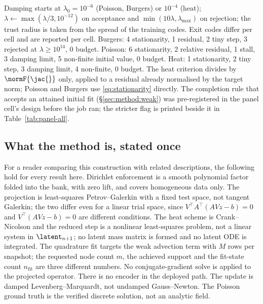 Damping starts at $\lambda_0=10^{-6}$ (Poisson, Burgers) or $10^{-4}$ (heat);
$\lambda\leftarrow\max(\lambda/3,10^{-12})$ on acceptance and
$\min(10\lambda,\lambda_{\max})$ on rejection; the trust radius is taken from the
spread of the training codes. Exit codes differ per cell and are reported per
cell. Burgers: 4 stationarity, 1 residual, 2 tiny step, 3 rejected at
$\lambda\ge10^{14}$, 0 budget. Poisson: 6 stationarity, 2 relative residual, 1
stall, 3 damping limit, 5 non-finite initial value, 0 budget. Heat: 1
stationarity, 2 tiny step, 3 damping limit, 4 non-finite, 0 budget. The heat
criterion divides by $\normF{\jac{}}$ only, applied to a residual already
normalised by the target norm; Poisson and Burgers use \eqref{eq:stationarity}
directly. The completion rule that accepts an attained initial fit
(\S\ref{sec:method:weak}) was pre-registered in the panel cell's design before
the job ran; the stricter flag is printed beside it in Table~\ref{tab:panel-all}.

\subsection{What the method is, stated once}
\label{app:method:statements}

For a reader comparing this construction with related descriptions, the
following hold for every result here. Dirichlet enforcement is a smooth
polynomial factor folded into the bank, with zero lift, and covers homogeneous
data only. The projection is least-squares Petrov--Galerkin with a fixed test
space, not tangent Galerkin; the two differ even for a linear trial space,
since $V^\top A^\top(AVz-b)=0$ and $V^\top(AVz-b)=0$ are different conditions.
The heat scheme is Crank--Nicolson and the reduced step is a nonlinear
least-squares problem, not a linear system in $\latent_{n+1}$; no latent mass
matrix is formed and no latent ODE is integrated. The quadrature fit targets
the weak advection term with $M$ rows per snapshot; the requested node count
$m$, the achieved support and the fit-state count $n_{\text{fit}}$ are three
different numbers. No conjugate-gradient solve is applied to the projected
operator. There is no encoder in the deployed path. The update is damped
Levenberg--Marquardt, not undamped Gauss--Newton. The Poisson ground truth is
the verified discrete solution, not an analytic field.
